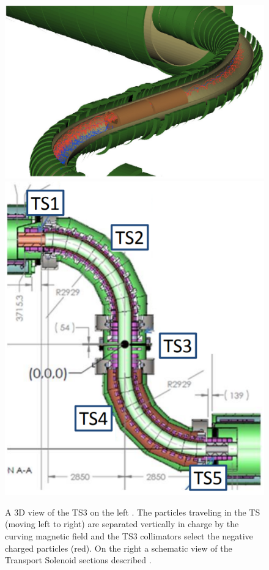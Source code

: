 \documentclass[12pt,a4paper,openright, oneside, titlepage]{book} %
\begin{document}
\begin{figure}[h!]
\centering
\includegraphics[scale=0.5]{MuonBeamline_TS_window_2} \hfill
\includegraphics[scale=0.48]{MuonBeamline_TS_3}
\caption[Transport Solenoid]{A 3D view of the TS3 on the left \cite{bob_mu2e}. The particles traveling in the TS (moving left to right) are separated vertically in charge by the curving magnetic field and the TS3 collimators select the negative charged particles (red). 
On the right a schematic view of the Transport Solenoid sections described \cite{TS}.}
\label{_TS3}
\end{figure}
\end{document}
